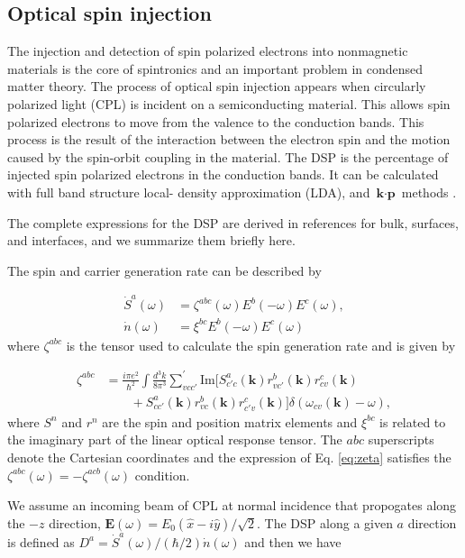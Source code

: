 \documentclass[pss]{wiley2sp} %
\begin{document}
\subsection{Optical spin injection}

The injection and detection of spin polarized electrons into nonmagnetic
materials is the core of spintronics \cite{vzutic2004spintronics,%
fert2008nobel,pezzoli2012optical,bottegoni2013experimental,%
bottegoni2013photoinduced} and an important problem in condensed matter
theory. The process of optical spin injection appears when circularly
polarized light (CPL) \cite{dyakonov1984theory} is incident on a
semiconducting material. This allows spin polarized electrons to move from the
valence to the conduction bands. This process is the result of the interaction
between the electron spin and the motion caused by the spin-orbit coupling in
the material. The DSP is the percentage of injected spin polarized electrons
in the conduction bands. It can be calculated with full band structure local-
density approximation (LDA), and $\textbf{k}\cdot\textbf{p}$ methods
\cite{nastos2007full,cabellos2009stress}.

The complete expressions for the DSP are derived in references
\cite{nastos2007full,mendoza2012optical} for bulk, surfaces, and interfaces, 
and we summarize them briefly here. 

The spin and carrier generation rate can be described by 

\begin{changed}
\begin{align*}
\dot{S}^{a}(\omega) &= \zeta^{abc}(\omega)E^{b}(-\omega)E^{c}(\omega), \nonumber \\ 
\dot{n}(\omega)     &= \xi^{bc}E^{b}(-\omega)E^{c}(\omega)
\end{align*}
where $\zeta^{abc}$ is the tensor used to calculate the spin generation 
rate and is given by

\begin{align}\label{eq:zeta}
\zeta^{abc} &= \frac{i\pi e^{2}}{\hbar^{2}}\int\frac{d^{3}k}{8\pi^{3}}
\sum_{vcc'}^{\prime}\text{Im}\bigl[S^{a}_{c'c}(\textbf{k})
r^{b}_{vc'}(\textbf{k})r^{c}_{cv}(\textbf{k})\nonumber\\
&\qquad+S^{a}_{cc'}(\textbf{k})
r^{b}_{vc}(\textbf{k})r^{c}_{c'v}(\textbf{k})\bigr]
\delta(\omega_{cv}(\textbf{k})-\omega),
\end{align}
where $S^{n}$ and $r^{n}$ are the spin and position matrix elements and $\xi^{bc}$ is related to the imaginary part of the linear optical response tensor. The $abc$ superscripts denote the Cartesian coordinates and the expression of Eq. \eqref{eq:zeta} satisfies the $\zeta^{abc}(\omega) = -\zeta^{acb}(\omega)$ condition.

We assume an incoming beam of CPL at normal incidence that propogates along the $-z$ direction, $\mathbf{E}(\omega) = E_{0}(\hat{x} - i\hat{y})/\sqrt{2}$. The DSP along a given $a$ direction is defined as $D^{a}=\dot{S}^{a}(\omega)/(\hbar/2)\dot{n}(\omega)$ and then we have
\end{changed}
\end{document}
